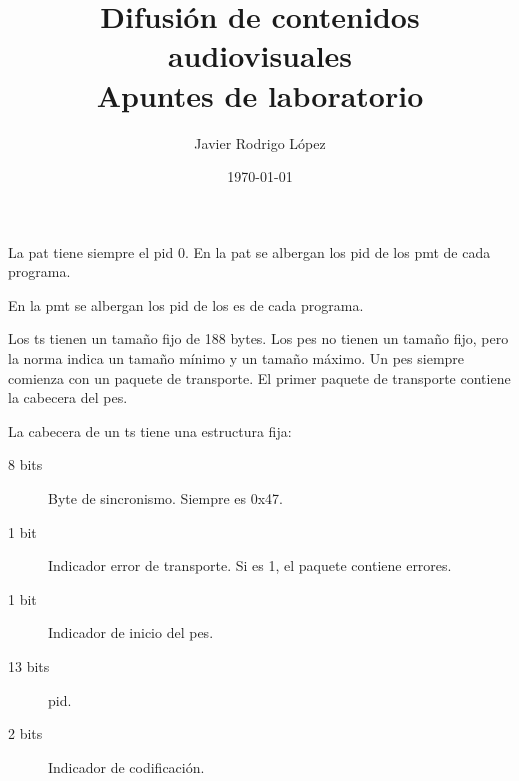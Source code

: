 \documentclass[10pt]{book}
\title{\Huge Difusión de contenidos audiovisuales\\\huge Apuntes de laboratorio}
\author{Javier Rodrigo López}
\date{\today}
\begin{document}
\maketitle

\tableofcontents

\printacronyms
\acresetall


\newpage

\chapter{}

La \ac{pat} tiene siempre el \ac{pid} 0. En la \ac{pat} se albergan los \ac{pid} de los \ac{pmt} de cada programa.

En la \ac{pmt} se albergan los \ac{pid} de los \ac{es} de cada programa.

Los \ac{ts} tienen un tamaño fijo de 188 bytes. Los \ac{pes} no tienen un tamaño fijo, pero la norma indica un tamaño mínimo y un tamaño máximo. Un \ac{pes} siempre comienza con un paquete de transporte. El primer paquete de transporte contiene la cabecera del \ac{pes}.

La cabecera de un \ac{ts} tiene una estructura fija:
\begin{description}
  \item[8 bits] Byte de sincronismo. Siempre es 0x47.
  \item[1 bit] Indicador error de transporte. Si es 1, el paquete contiene errores.
  \item[1 bit] Indicador de inicio del \ac{pes}.
  \item[13 bits] \ac{pid}.
  \item[2 bits] Indicador de codificación.
\end{description}
\end{document}

